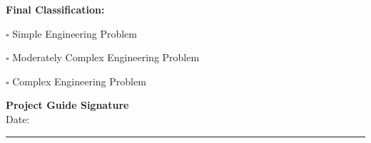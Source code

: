 \vspace{0.35cm}

\noindent
\textbf{Final Classification:}

\vspace{0.15cm}

\noindent
$\square$ Simple Engineering Problem

\vspace{0.15cm}

\noindent
$\square$ Moderately Complex Engineering Problem

\vspace{0.15cm}

\noindent
$\square$ Complex Engineering Problem



\centering
\textbf{Project Guide Signature}
\\[0.8cm]

\centering
Date: \rule{3cm}{0.4pt}



